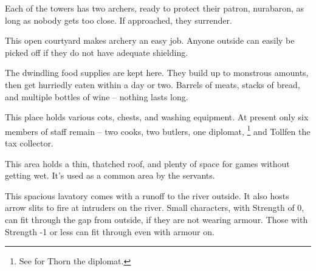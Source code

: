 
Each of the towers has two archers, ready to protect their patron, \gls{nurabaron}, as long as nobody gets too close.
If approached, they surrender.




This open courtyard makes archery an easy job.  Anyone outside can easily be picked off if they do not have adequate shielding.


The dwindling food supplies are kept here.  They build up to monstrous amounts, then get hurriedly eaten within a day or two.  Barrels of meats, stacks of bread, and multiple bottles of wine -- nothing lasts long.


This place holds various cots, chests, and washing equipment.
At present only six members of staff remain -- two cooks, two butlers, one diplomat,%
\footnote{See  for Thorn the diplomat.}
and Tollfen the tax collector.



This area holds a thin, thatched roof, and plenty of space for games without getting wet.
It's used as a common area by the servants.


This spacious lavatory comes with a runoff to the river outside.
It also hosts arrow slits to fire at intruders on the river.
Small characters, with Strength of 0, can fit through the gap from outside, if they are not wearing armour.
Those with Strength -1 or less can fit through even with armour on.

